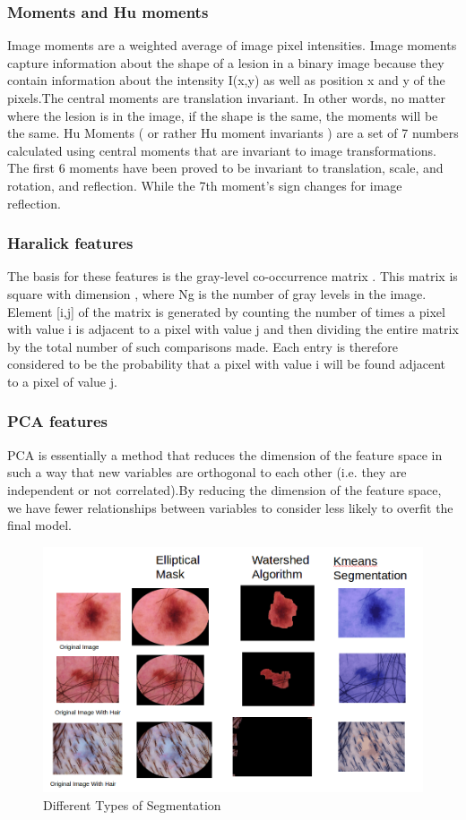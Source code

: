 \subsubsection{Moments and Hu moments}
Image moments are a weighted average of image pixel intensities. Image moments capture information about the shape of a lesion in a binary image because they contain information about the intensity I(x,y) as well as position x and y of the pixels.The central moments are translation invariant. In other words, no matter where the lesion is in the image, if the shape is the same, the moments will be the same.       Hu Moments ( or rather Hu moment invariants ) are a set of 7 numbers calculated using central moments that are invariant to image transformations. The first 6 moments have been proved to be invariant to translation, scale, and rotation, and reflection. While the 7th moment’s sign changes for image reflection.
\subsubsection{Haralick features}
The basis for these features is the gray-level co-occurrence matrix . This matrix is square with dimension , where Ng is the number of gray levels in the image. Element [i,j] of the matrix is generated by counting the number of times a pixel with value i is adjacent to a pixel with value j and then dividing the entire matrix by the total number of such comparisons made. Each entry is therefore considered to be the probability that a pixel with value i will be found adjacent to a pixel of value j.

\subsubsection{PCA features}
PCA is essentially a method that reduces the dimension of the feature space in such a way that new variables are orthogonal to each other (i.e. they are independent or not correlated).By reducing the dimension of the feature space, we have fewer relationships between variables to consider  less likely to overfit the final model.
\begin{figure}
	\centering
	\includegraphics[width=1\linewidth]{pictures/Segmentation.png}  %
	\caption{Different Types of Segmentation}
	\label{SVM_ROC}
\end{figure}

